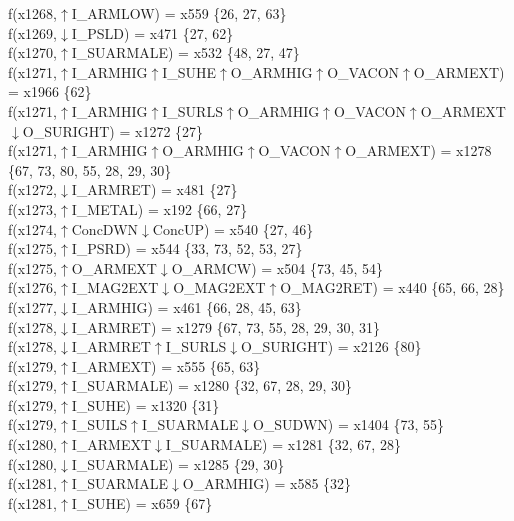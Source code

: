 f(x1268,$\uparrow$I\_ARMLOW) = x559 \{26, 27, 63\} \\  
f(x1269,$\downarrow$I\_PSLD) = x471 \{27, 62\} \\  
f(x1270,$\uparrow$I\_SUARMALE) = x532 \{48, 27, 47\} \\  
f(x1271,$\uparrow$I\_ARMHIG$\uparrow$I\_SUHE$\uparrow$O\_ARMHIG$\uparrow$O\_VACON$\uparrow$O\_ARMEXT) = x1966 \{62\} \\  
f(x1271,$\uparrow$I\_ARMHIG$\uparrow$I\_SURLS$\uparrow$O\_ARMHIG$\uparrow$O\_VACON$\uparrow$O\_ARMEXT$\downarrow$O\_SURIGHT) = x1272 \{27\} \\  
f(x1271,$\uparrow$I\_ARMHIG$\uparrow$O\_ARMHIG$\uparrow$O\_VACON$\uparrow$O\_ARMEXT) = x1278 \{67, 73, 80, 55, 28, 29, 30\} \\  
f(x1272,$\downarrow$I\_ARMRET) = x481 \{27\} \\  
f(x1273,$\uparrow$I\_METAL) = x192 \{66, 27\} \\  
f(x1274,$\uparrow$ConcDWN$\downarrow$ConcUP) = x540 \{27, 46\} \\  
f(x1275,$\uparrow$I\_PSRD) = x544 \{33, 73, 52, 53, 27\} \\  
f(x1275,$\uparrow$O\_ARMEXT$\downarrow$O\_ARMCW) = x504 \{73, 45, 54\} \\  
f(x1276,$\uparrow$I\_MAG2EXT$\downarrow$O\_MAG2EXT$\uparrow$O\_MAG2RET) = x440 \{65, 66, 28\} \\  
f(x1277,$\downarrow$I\_ARMHIG) = x461 \{66, 28, 45, 63\} \\  
f(x1278,$\downarrow$I\_ARMRET) = x1279 \{67, 73, 55, 28, 29, 30, 31\} \\  
f(x1278,$\downarrow$I\_ARMRET$\uparrow$I\_SURLS$\downarrow$O\_SURIGHT) = x2126 \{80\} \\  
f(x1279,$\uparrow$I\_ARMEXT) = x555 \{65, 63\} \\  
f(x1279,$\uparrow$I\_SUARMALE) = x1280 \{32, 67, 28, 29, 30\} \\  
f(x1279,$\uparrow$I\_SUHE) = x1320 \{31\} \\  
f(x1279,$\uparrow$I\_SUILS$\uparrow$I\_SUARMALE$\downarrow$O\_SUDWN) = x1404 \{73, 55\} \\  
f(x1280,$\uparrow$I\_ARMEXT$\downarrow$I\_SUARMALE) = x1281 \{32, 67, 28\} \\  
f(x1280,$\downarrow$I\_SUARMALE) = x1285 \{29, 30\} \\  
f(x1281,$\uparrow$I\_SUARMALE$\downarrow$O\_ARMHIG) = x585 \{32\} \\  
f(x1281,$\uparrow$I\_SUHE) = x659 \{67\} \\  

